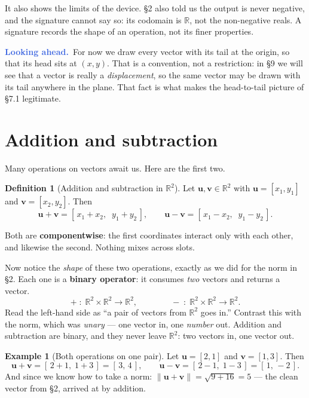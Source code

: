 \documentclass[11pt]{article}
\theoremstyle{definition}
\newtheorem{defn}{Definition}[section]
\newtheorem{ex}{Example}[section]
\theoremstyle{remark}
\newcommand{\lookahead}{\par\smallskip\noindent
  \textbf{\sffamily\textcolor{RoyalBlue}{Looking ahead.}}\ \ignorespaces}
\newcommand{\R}{\mathbb{R}}
\newcommand{\vc}[1]{\mathbf{#1}}
\newcommand{\norm}[1]{\lVert #1\rVert}
\begin{document}
It also shows the limits of the device. \S2 also told us the output is never
negative, and the signature cannot say so: its codomain is $\R$, not the
non-negative reals. A signature records the shape of an operation, not its
finer properties.

\lookahead For now we draw every vector with its tail at the origin, so that its
head sits at $(x,y)$. That is a convention, not a restriction: in \S9 we will
see that a vector is really a \emph{displacement}, so the same vector may be
drawn with its tail anywhere in the plane. That fact is what makes the
head-to-tail picture of \S7.1 legitimate.

\section{Addition and subtraction}
Many operations on vectors await us. Here are the first two.

\begin{defn}[Addition and subtraction in $\R^2$]
Let $\vc{u},\vc{v}\in\R^{2}$ with $\vc{u}=[x_1,y_1]$ and $\vc{v}=[x_2,y_2]$.
Then
\[
  \vc{u}+\vc{v}=[\,x_1+x_2,\;\;y_1+y_2\,],
  \qquad
  \vc{u}-\vc{v}=[\,x_1-x_2,\;\;y_1-y_2\,].
\]
\end{defn}

\noindent Both are \textbf{componentwise}: the first coordinates interact only
with each other, and likewise the second. Nothing mixes across slots.

\smallskip
\noindent Now notice the \emph{shape} of these two operations, exactly as we did
for the norm in \S2. Each one is a \textbf{binary operator}: it consumes
\emph{two} vectors and returns a vector.
\[
  +\;:\;\R^{2}\times\R^{2}\to\R^{2},
  \qquad\qquad
  -\;:\;\R^{2}\times\R^{2}\to\R^{2}.
\]
Read the left-hand side as ``a pair of vectors from $\R^{2}$ goes in.'' Contrast
this with the norm, which was \emph{unary} --- one vector in, one \emph{number}
out. Addition and subtraction are binary, and they never leave $\R^{2}$: two
vectors in, one vector out.

\begin{ex}[Both operations on one pair]
Let $\vc{u}=[2,1]$ and $\vc{v}=[1,3]$. Then
\[
  \vc{u}+\vc{v}=[\,2+1,\;1+3\,]=[\,3,\,4\,],
  \qquad
  \vc{u}-\vc{v}=[\,2-1,\;1-3\,]=[\,1,\,-2\,].
\]
And since we know how to take a norm: $\norm{\vc{u}+\vc{v}}=\sqrt{9+16}=5$ ---
the clean vector from \S2, arrived at by addition.
\end{ex}
\end{document}
